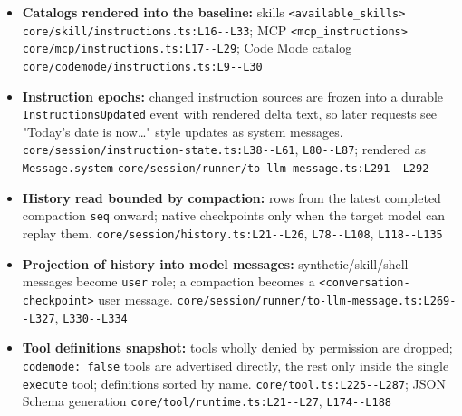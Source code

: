\begin{itemize}
\item \textbf{Catalogs rendered into the baseline:} skills \texttt{<available\_\allowbreak{}skills>} \texttt{core/\allowbreak{}skill/\allowbreak{}instructions.\allowbreak{}ts:\allowbreak{}L16-\allowbreak{}-\allowbreak{}L33}; MCP \texttt{<mcp\_\allowbreak{}instructions>} \texttt{core/\allowbreak{}mcp/\allowbreak{}instructions.\allowbreak{}ts:\allowbreak{}L17-\allowbreak{}-\allowbreak{}L29}; Code Mode catalog \texttt{core/\allowbreak{}codemode/\allowbreak{}instructions.\allowbreak{}ts:\allowbreak{}L9-\allowbreak{}-\allowbreak{}L30}
\item \textbf{Instruction epochs:} changed instruction sources are frozen into a durable \texttt{InstructionsUpdated} event with rendered delta text, so later requests see "Today's date is now\ldots{}" style updates as system messages. \texttt{core/\allowbreak{}session/\allowbreak{}instruction-\allowbreak{}state.\allowbreak{}ts:\allowbreak{}L38-\allowbreak{}-\allowbreak{}L61}, \texttt{L80-\allowbreak{}-\allowbreak{}L87}; rendered as \texttt{Message.\allowbreak{}system} \texttt{core/\allowbreak{}session/\allowbreak{}runner/\allowbreak{}to-\allowbreak{}llm-\allowbreak{}message.\allowbreak{}ts:\allowbreak{}L291-\allowbreak{}-\allowbreak{}L292}
\item \textbf{History read bounded by compaction:} rows from the latest completed compaction \texttt{seq} onward; native checkpoints only when the target model can replay them. \texttt{core/\allowbreak{}session/\allowbreak{}history.\allowbreak{}ts:\allowbreak{}L21-\allowbreak{}-\allowbreak{}L26}, \texttt{L78-\allowbreak{}-\allowbreak{}L108}, \texttt{L118-\allowbreak{}-\allowbreak{}L135}
\item \textbf{Projection of history into model messages:} synthetic/skill/shell messages become \texttt{user} role; a compaction becomes a \texttt{<conversation-\allowbreak{}checkpoint>} user message. \texttt{core/\allowbreak{}session/\allowbreak{}runner/\allowbreak{}to-\allowbreak{}llm-\allowbreak{}message.\allowbreak{}ts:\allowbreak{}L269-\allowbreak{}-\allowbreak{}L327}, \texttt{L330-\allowbreak{}-\allowbreak{}L334}
\item \textbf{Tool definitions snapshot:} tools wholly denied by permission are dropped; \texttt{codemode:\allowbreak{} false} tools are advertised directly, the rest only inside the single \texttt{execute} tool; definitions sorted by name. \texttt{core/\allowbreak{}tool.\allowbreak{}ts:\allowbreak{}L225-\allowbreak{}-\allowbreak{}L287}; JSON Schema generation \texttt{core/\allowbreak{}tool/\allowbreak{}runtime.\allowbreak{}ts:\allowbreak{}L21-\allowbreak{}-\allowbreak{}L27}, \texttt{L174-\allowbreak{}-\allowbreak{}L188}

\end{itemize}
